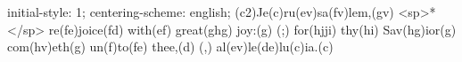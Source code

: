 initial-style: 1;
centering-scheme: english;
(c2)Je(c)ru(ev)sa(fv)lem,(gv) <sp>*</sp> re(fe)joice(fd) with(ef) great(ghg) joy:(g) (;) for(hjji) thy(hi) Sav(hg)ior(g) com(hv)eth(g) un(f)to(fe) thee,(d) (,) al(ev)le(de)lu(c)ia.(c)
